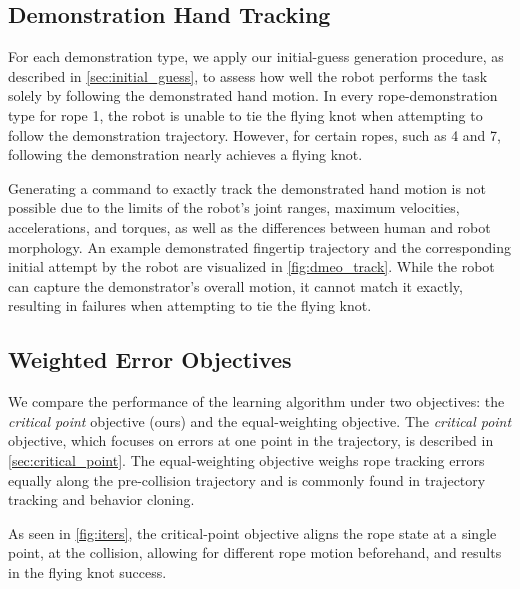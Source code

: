 \documentclass[conference]{IEEEtran}
\begin{document}
\subsection{Demonstration Hand Tracking}
For each demonstration type, we apply our initial-guess generation procedure, as described in \cref{sec:initial_guess}, to assess how well the robot performs the task solely by following the demonstrated hand motion. In every rope-demonstration type for rope 1, the robot is unable to tie the flying knot when attempting to follow the demonstration trajectory. However, for certain ropes, such as 4 and 7, following the demonstration nearly achieves a flying knot.

Generating a command to exactly track the demonstrated hand motion is not possible due to the limits of the robot's joint ranges, maximum velocities, accelerations, and torques, as well as the differences between human and robot morphology. An example demonstrated fingertip trajectory and the corresponding initial attempt by the robot are visualized in \cref{fig:dmeo_track}. While the robot can capture the demonstrator's overall motion, it cannot match it exactly, resulting in failures when attempting to tie the flying knot.    





\subsection{Weighted Error Objectives}
\label{sec:critical_point_obj}


We compare the performance of the learning algorithm under two objectives: the \textit{critical point} objective (ours) and the equal-weighting objective. The \textit{critical point} objective, which focuses on errors at one point in the trajectory, is described in \cref{sec:critical_point}. The equal-weighting objective weighs rope tracking errors equally along the pre-collision trajectory and is commonly found in trajectory tracking and behavior cloning. 

As seen in \cref{fig:iters}, the critical-point objective aligns the rope state at a single point, at the collision, allowing for different rope motion beforehand, and results in the flying knot success.
\end{document}
